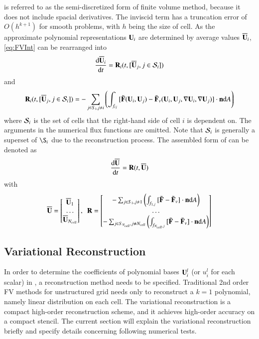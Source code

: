 is referred to as the semi-discretized form of finite volume method,
because it does not include spacial derivatives.
The inviscid term has a truncation error of $O(h^{k+1})$ for smooth problems,
with $h$ being the size of cell.
As the approximate polynomial representations $\mathbf{U}_i$ are determined
by average values $\overline{\mathbf{U}}_i$, \eqref{eq:FVInt} can be rearranged into
\begin{equation}
    \label{eq:FVODECell}
    \derivative{\uu_i}{t} = \R_i(t, [\uu_j, j\in\SAll_i])
\end{equation}
and
\begin{equation}
    \mathbf{R}_i(t, [\overline{\mathbf{U}}_j, j\in\mathcal{S}_i]) = -\sum_{j\in S_i, j\neq i}{\left(
        \int_{f_{ij}}{
            [\tilde{\mathbf{F}}(\mathbf{U}_i,\mathbf{U}_j) - \tilde{\mathbf{F}}_v(\mathbf{U}_i,\mathbf{U}_j, \nabla \mathbf{U}_i, \nabla \mathbf{U}_j)] \cdot \mathbf{n}  \dd A
        }\right)
    }
\end{equation}
where
$\mathcal{S}_i$ is the set of cells that the right-hand side of cell $i$ is
dependent on. The arguments in the numerical flux functions are omitted.
Note that $\mathcal{S}_i$ is generally a superset of $\S_i$ due to
the reconstruction process.
The
assembled form of  can be denoted as
\begin{equation}
    \label{eq:FVODE}
    \derivative{\uu}{t} = \R(t, \uu)
\end{equation}
with
\begin{equation}
    \overline{\mathbf{U}} = \begin{bmatrix}
        \overline{\mathbf{U}}_1 \\
        \dots \\
        \overline{\mathbf{U}}_{N_{cell}}
    \end{bmatrix},\ \
    \mathbf{R} = \begin{bmatrix}
        -\sum_{j\in S_1, j\neq 1}{\left(
            \int_{f_{1,j}}{
                [\tilde{\mathbf{F}} - \tilde{\mathbf{F}}_v] \cdot \mathbf{n}  \dd A
            }\right)
        }     \\
        \dots \\
        -\sum_{j\in S_{N_{cell}}, j\neq N_{cell}}{\left(
            \int_{f_{N_{cell},j}}{
                [\tilde{\mathbf{F}} - \tilde{\mathbf{F}}_v] \cdot \mathbf{n}  \dd A
            }\right)
        }
    \end{bmatrix}
\end{equation}





\subsection{Variational Reconstruction}
\label{ssec:VR}
In order to determine the coefficients of polynomial bases $\mathbf{U}_i^l$ (or $u_i^l$ for each scalar) in
\eeqref{eq:FVRec}, a reconstruction method needs to be specified.
Traditional 2nd order FV methods for unstructured grid
needs only to reconstruct a $k=1$ polynomial, namely linear
distribution on each cell.
The variational reconstruction \cite{wang2017compact_VR}
is a compact high-order
reconstruction scheme, and it achieves high-order
accuracy on a compact stencil.
The current section will explain the variational reconstruction briefly
and specify details concerning following numerical tests.

